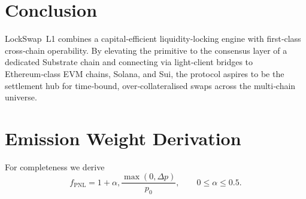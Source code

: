 \documentclass[11pt]{article}
\begin{document}
\section{Conclusion}
LockSwap L1 combines a capital‑efficient liquidity‑locking engine with first‑class cross‑chain operability.  By elevating the primitive to the consensus layer of a dedicated Substrate chain and connecting via light‑client bridges to Ethereum‑class EVM chains, Solana, and Sui, the protocol aspires to be the settlement hub for time‑bound, over‑collateralised swaps across the multi‑chain universe.

\appendix
\section{Emission Weight Derivation}\label{app:emission}
For completeness we derive
\begin{equation}
f_{\text{PNL}} = 1 + \alpha,\frac{\max(0,\Delta p)}{p_0},\qquad 0\le\alpha\le0.5.
\end{equation}
\end{document}
